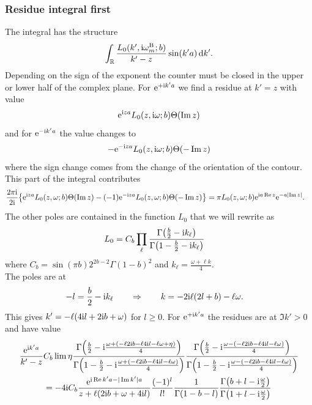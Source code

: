 \documentclass[english, parskip=full]{scrartcl}
\begin{document}
\subsubsection{Residue integral first}
The integral has the structure
\begin{align}
\int_{\mathbb{R}} \frac{L_0(k',\text{i}\omega_m^{\text{B}}; b)}{k'-z} \sin(k'a) \, \mathrm{d}k'.
\end{align}
Depending on the sign of the exponent the counter must be closed in the upper or lower half of the complex plane.
For $\text{e}^{+\text{i} k' a}$ we find a residue at $k'=z$ with value
\begin{align}
\text{e}^{\text{i} za} L_0(z,\text{i}\omega; b) \Theta(\Im z)
\end{align}
and for $\text{e}^{-\text{i} k'a}$ the value changes to
\begin{align}
-\text{e}^{-\text{i} za} L_0(z,\text{i}\omega; b)\Theta(-\Im z)
\end{align}
where the sign change comes from the change of the orientation of the contour.
This part of the integral contributes
\begin{align}
\frac{2\pi\i}{2\i} \klc*{\powe{\i za} L_0(z,\omega; b) \Theta(\Im z) - (-1) \powe{-\i za} L_0(z,\omega; b)\Theta(-\Im z)} &= \pi L_0(z,\omega; b) \powe{\i a\Re z} \powe{-a\abs*{\Im z}}.
\end{align}
The other poles are contained in the function $L_0$ that we will rewrite as
\begin{align}
L_0 &= C_b \prod_\ell \frac{\Gamma\kla*{\frac{b}{2} - \i k_\ell}}{\Gamma\kla*{1-\frac{b}{2} - \i k_\ell}}
\end{align}
where $C_b = \sin(\pi b)2^{2b-2} \Gamma(1-b)^2$ and $k_\ell = \frac{\omega + \ell k}{4}$.\\
The poles are at
\begin{align}
-l &= \frac{b}{2} - \text{i} k_\ell \qquad \Rightarrow\qquad k = -2\text{i}\ell (2l+b) - \ell\omega.
\end{align}
This gives $k'=-\ell(4\text{i} l + 2\text{i} b + \omega)$ for $l\ge 0$.
For $\text{e}^{+\text{i} k'a}$ the residues are at $\Im k' > 0$ and have value
\begin{align}
\frac{\powe{\i k'a}}{k'-z} &C_b \lim \eta\frac{\Gamma\kla*{\frac{b}{2} - \i \frac{\omega + (-\ell 2\i b -\ell 4\i l - \ell \omega + \eta)}{4}}}{\Gamma\kla*{1-\frac{b}{2} - \i \frac{\omega + (-\ell 2\i b -\ell 4\i l - \ell \omega)}{4}}} \frac{\Gamma\kla*{\frac{b}{2} - \i \frac{\omega - (-\ell 2\i b -\ell 4\i l - \ell \omega)}{4}}}{\Gamma\kla*{1-\frac{b}{2} - \i \frac{\omega - (-\ell 2\i b -\ell 4\i l - \ell \omega)}{4}}}\\
&= -4\i C_b \frac{\powe{\i \Re k'a - |\Im k'|a}}{z + \ell (2\i b + \omega + 4\i l)} \frac{(-1)^l}{l!} \frac{1}{\Gamma(1-b-l)} \frac{\Gamma\kla*{b + l-\i\frac{\omega}{2}}}{\Gamma\kla*{1+l-\i\frac{\omega}{2}}}
\end{align}
\end{document}
